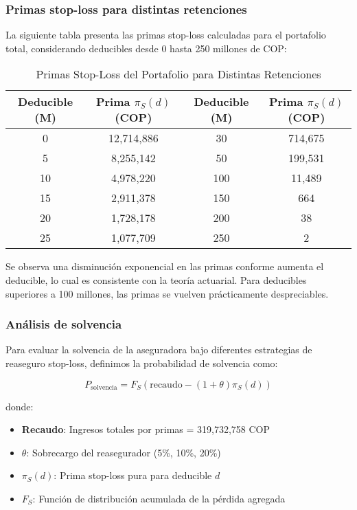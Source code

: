 \subsubsection{Primas stop-loss para distintas retenciones}

La siguiente tabla presenta las primas stop-loss calculadas para el portafolio total, considerando deducibles desde 0 hasta 250 millones de COP:

\begin{table}[H]
\centering
\caption{Primas Stop-Loss del Portafolio para Distintas Retenciones}
\begin{tabular}{cccc}
\hline
\textbf{Deducible (M)} & \textbf{Prima $\pi_S(d)$ (COP)} & \textbf{Deducible (M)} & \textbf{Prima $\pi_S(d)$ (COP)} \\
\hline
0 & 12,714,886 & 30 & 714,675 \\
5 & 8,255,142 & 50 & 199,531 \\
10 & 4,978,220 & 100 & 11,489 \\
15 & 2,911,378 & 150 & 664 \\

20 & 1,728,178 & 200 & 38 \\
25 & 1,077,709 & 250 & 2 \\
\hline
\end{tabular}
\end{table}

Se observa una disminución exponencial en las primas conforme aumenta el deducible, lo cual es consistente con la teoría actuarial. Para deducibles superiores a 100 millones, las primas se vuelven prácticamente despreciables.

\subsubsection{Análisis de solvencia}

Para evaluar la solvencia de la aseguradora bajo diferentes estrategias de reaseguro stop-loss, definimos la probabilidad de solvencia como:

$$P_{\text{solvencia}} = F_S(\text{recaudo} - (1+\theta)\pi_S(d))$$

donde:
\begin{itemize}
\item \textbf{Recaudo}: Ingresos totales por primas = 319,732,758 COP
\item \textbf{$\theta$}: Sobrecargo del reasegurador (5\%, 10\%, 20\%)
\item \textbf{$\pi_S(d)$}: Prima stop-loss pura para deducible $d$
\item \textbf{$F_S$}: Función de distribución acumulada de la pérdida agregada
\end{itemize}

